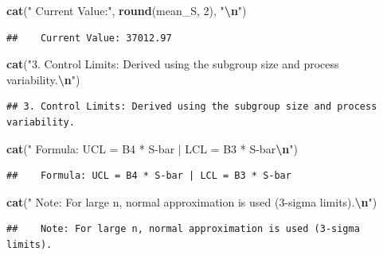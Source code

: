 \documentclass[
]{article}
\newenvironment{Shaded}{\begin{snugshade}}{\end{snugshade}}
\newcommand{\DecValTok}[1]{\textcolor[rgb]{0.00,0.00,0.81}{#1}}
\newcommand{\FunctionTok}[1]{\textcolor[rgb]{0.13,0.29,0.53}{\textbf{#1}}}
\newcommand{\NormalTok}[1]{#1}
\newcommand{\SpecialCharTok}[1]{\textcolor[rgb]{0.81,0.36,0.00}{\textbf{#1}}}
\newcommand{\StringTok}[1]{\textcolor[rgb]{0.31,0.60,0.02}{#1}}
\begin{document}
\begin{Shaded}
\begin{Highlighting}[]
\FunctionTok{cat}\NormalTok{(}\StringTok{"   Current Value:"}\NormalTok{, }\FunctionTok{round}\NormalTok{(mean\_S, }\DecValTok{2}\NormalTok{), }\StringTok{"}\SpecialCharTok{\textbackslash{}n}\StringTok{"}\NormalTok{)}
\end{Highlighting}
\end{Shaded}

\begin{verbatim}
##    Current Value: 37012.97
\end{verbatim}

\begin{Shaded}
\begin{Highlighting}[]
\FunctionTok{cat}\NormalTok{(}\StringTok{"3. Control Limits: Derived using the subgroup size and process variability.}\SpecialCharTok{\textbackslash{}n}\StringTok{"}\NormalTok{)}
\end{Highlighting}
\end{Shaded}

\begin{verbatim}
## 3. Control Limits: Derived using the subgroup size and process variability.
\end{verbatim}

\begin{Shaded}
\begin{Highlighting}[]
\FunctionTok{cat}\NormalTok{(}\StringTok{"   Formula: UCL = B4 * S{-}bar | LCL = B3 * S{-}bar}\SpecialCharTok{\textbackslash{}n}\StringTok{"}\NormalTok{)}
\end{Highlighting}
\end{Shaded}

\begin{verbatim}
##    Formula: UCL = B4 * S-bar | LCL = B3 * S-bar
\end{verbatim}

\begin{Shaded}
\begin{Highlighting}[]
\FunctionTok{cat}\NormalTok{(}\StringTok{"   Note: For large n, normal approximation is used (3{-}sigma limits).}\SpecialCharTok{\textbackslash{}n}\StringTok{"}\NormalTok{)}
\end{Highlighting}
\end{Shaded}

\begin{verbatim}
##    Note: For large n, normal approximation is used (3-sigma limits).
\end{verbatim}
\end{document}
